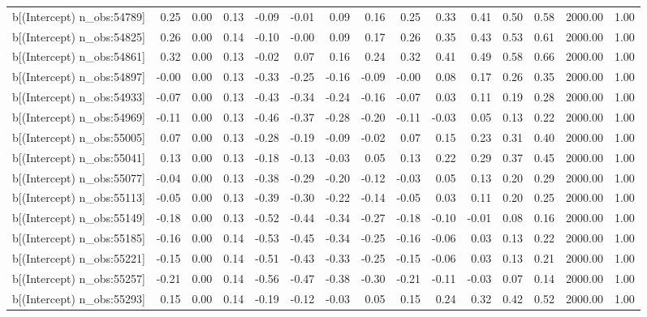 \begin{table}[ht]
\begin{tabular}{rrrrrrrrrrrrrrr}
  b[(Intercept) n\_obs:54789] & 0.25 & 0.00 & 0.13 & -0.09 & -0.01 & 0.09 & 0.16 & 0.25 & 0.33 & 0.41 & 0.50 & 0.58 & 2000.00 & 1.00 \\ 
  b[(Intercept) n\_obs:54825] & 0.26 & 0.00 & 0.14 & -0.10 & -0.00 & 0.09 & 0.17 & 0.26 & 0.35 & 0.43 & 0.53 & 0.61 & 2000.00 & 1.00 \\ 
  b[(Intercept) n\_obs:54861] & 0.32 & 0.00 & 0.13 & -0.02 & 0.07 & 0.16 & 0.24 & 0.32 & 0.41 & 0.49 & 0.58 & 0.66 & 2000.00 & 1.00 \\ 
  b[(Intercept) n\_obs:54897] & -0.00 & 0.00 & 0.13 & -0.33 & -0.25 & -0.16 & -0.09 & -0.00 & 0.08 & 0.17 & 0.26 & 0.35 & 2000.00 & 1.00 \\ 
  b[(Intercept) n\_obs:54933] & -0.07 & 0.00 & 0.13 & -0.43 & -0.34 & -0.24 & -0.16 & -0.07 & 0.03 & 0.11 & 0.19 & 0.28 & 2000.00 & 1.00 \\ 
  b[(Intercept) n\_obs:54969] & -0.11 & 0.00 & 0.13 & -0.46 & -0.37 & -0.28 & -0.20 & -0.11 & -0.03 & 0.05 & 0.13 & 0.22 & 2000.00 & 1.00 \\ 
  b[(Intercept) n\_obs:55005] & 0.07 & 0.00 & 0.13 & -0.28 & -0.19 & -0.09 & -0.02 & 0.07 & 0.15 & 0.23 & 0.31 & 0.40 & 2000.00 & 1.00 \\ 
  b[(Intercept) n\_obs:55041] & 0.13 & 0.00 & 0.13 & -0.18 & -0.13 & -0.03 & 0.05 & 0.13 & 0.22 & 0.29 & 0.37 & 0.45 & 2000.00 & 1.00 \\ 
  b[(Intercept) n\_obs:55077] & -0.04 & 0.00 & 0.13 & -0.38 & -0.29 & -0.20 & -0.12 & -0.03 & 0.05 & 0.13 & 0.20 & 0.29 & 2000.00 & 1.00 \\ 
  b[(Intercept) n\_obs:55113] & -0.05 & 0.00 & 0.13 & -0.39 & -0.30 & -0.22 & -0.14 & -0.05 & 0.03 & 0.11 & 0.20 & 0.25 & 2000.00 & 1.00 \\ 
  b[(Intercept) n\_obs:55149] & -0.18 & 0.00 & 0.13 & -0.52 & -0.44 & -0.34 & -0.27 & -0.18 & -0.10 & -0.01 & 0.08 & 0.16 & 2000.00 & 1.00 \\ 
  b[(Intercept) n\_obs:55185] & -0.16 & 0.00 & 0.14 & -0.53 & -0.45 & -0.34 & -0.25 & -0.16 & -0.06 & 0.03 & 0.13 & 0.22 & 2000.00 & 1.00 \\ 
  b[(Intercept) n\_obs:55221] & -0.15 & 0.00 & 0.14 & -0.51 & -0.43 & -0.33 & -0.25 & -0.15 & -0.06 & 0.03 & 0.13 & 0.21 & 2000.00 & 1.00 \\ 
  b[(Intercept) n\_obs:55257] & -0.21 & 0.00 & 0.14 & -0.56 & -0.47 & -0.38 & -0.30 & -0.21 & -0.11 & -0.03 & 0.07 & 0.14 & 2000.00 & 1.00 \\ 
  b[(Intercept) n\_obs:55293] & 0.15 & 0.00 & 0.14 & -0.19 & -0.12 & -0.03 & 0.05 & 0.15 & 0.24 & 0.32 & 0.42 & 0.52 & 2000.00 & 1.00 \\ 

\end{tabular}
\end{table}
